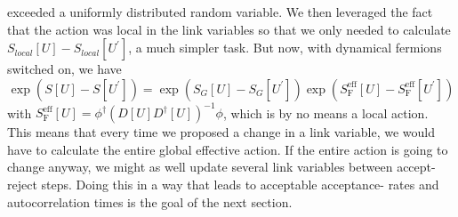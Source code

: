 \documentclass[a4paper,10pt]{book}
\begin{document}
exceeded a uniformly distributed random variable.
We then leveraged the fact that the action was local in the link variables so that we only needed to calculate $S_{local}[U]-S_{local}\left[U^{\prime}\right]$, a much simpler task. But now, with dynamical fermions switched on, we have 
\begin{equation}
\exp \left(S[U]-S\left[U^{\prime}\right]\right)=\exp \left(S_{G}[U]-S_{G}\left[U^{\prime}\right]\right) \exp \left(S_{\mathrm{F}}^{\mathrm{eff}}[U]-S_{\mathrm{F}}^{\mathrm{eff}}\left[U^{\prime}\right]\right)
\end{equation}
with $S_{\mathrm{F}}^{\mathrm{eff}}[U] =\phi^{\dagger}\left(D[U] D^{\dagger}[U]\right)^{-1} \phi $, which is by no means a local action. This means that every time we proposed a change in a link variable, we would have to calculate the entire global effective action. If the entire action is going to change anyway, we might as well update several link variables between accept-reject steps. Doing this in a way that leads to acceptable acceptance- rates and autocorrelation times is the goal of the next section.
\end{document}
